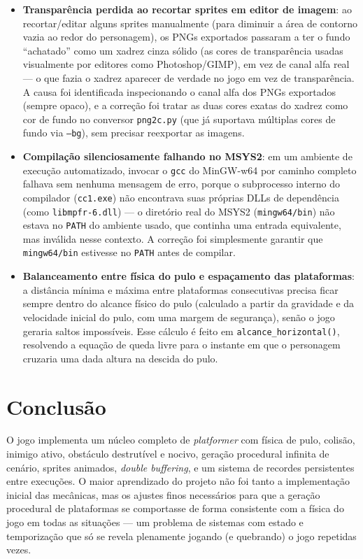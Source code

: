 \documentclass[a4paper,12pt]{article}
\newcommand{\code}[1]{\texttt{#1}}
\begin{document}
\begin{itemize}
    \item \textbf{Transparência perdida ao recortar sprites em editor de
    imagem}: ao recortar/editar alguns sprites manualmente (para diminuir a
    área de contorno vazia ao redor do personagem), os PNGs exportados
    passaram a ter o fundo ``achatado'' como um xadrez cinza sólido (as cores
    de transparência usadas visualmente por editores como Photoshop/GIMP),
    em vez de canal alfa real --- o que fazia o xadrez aparecer de verdade no
    jogo em vez de transparência. A causa foi identificada inspecionando o
    canal alfa dos PNGs exportados (sempre opaco), e a correção foi tratar as
    duas cores exatas do xadrez como cor de fundo no conversor
    \code{png2c.py} (que já suportava múltiplas cores de fundo via
    \code{--bg}), sem precisar reexportar as imagens.

    \item \textbf{Compilação silenciosamente falhando no MSYS2}: em um
    ambiente de execução automatizado, invocar o \code{gcc} do MinGW-w64 por
    caminho completo falhava sem nenhuma mensagem de erro, porque o
    subprocesso interno do compilador (\code{cc1.exe}) não encontrava suas
    próprias DLLs de dependência (como \code{libmpfr-6.dll}) --- o diretório
    real do MSYS2 (\code{mingw64/bin}) não estava no \code{PATH} do ambiente
    usado, que continha uma entrada equivalente, mas inválida nesse contexto.
    A correção foi simplesmente garantir que \code{mingw64/bin} estivesse no
    \code{PATH} antes de compilar.

    \item \textbf{Balanceamento entre física do pulo e espaçamento das
    plataformas}: a distância mínima e máxima entre plataformas consecutivas
    precisa ficar sempre dentro do alcance físico do pulo (calculado a partir
    da gravidade e da velocidade inicial do pulo, com uma margem de
    segurança), senão o jogo geraria saltos impossíveis. Esse cálculo é feito
    em \code{alcance\_horizontal()}, resolvendo a equação de queda livre para
    o instante em que o personagem cruzaria uma dada altura na descida do
    pulo.
\end{itemize}

\section{Conclusão}

O jogo implementa um núcleo completo de \emph{platformer} com física de pulo,
colisão, inimigo ativo, obstáculo destrutível e nocivo, geração procedural
infinita de cenário, sprites animados, \emph{double buffering}, e um sistema
de recordes persistentes entre execuções. O maior aprendizado do projeto não
foi tanto a implementação inicial das mecânicas, mas os ajustes finos
necessários para que a geração procedural de plataformas se comportasse de
forma consistente com a física do jogo em todas as situações --- um problema
de sistemas com estado e temporização que só se revela plenamente jogando
(e quebrando) o jogo repetidas vezes.
\end{document}
